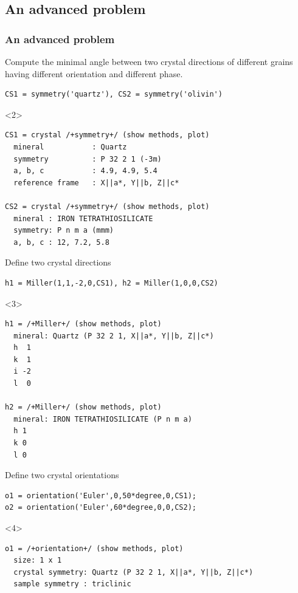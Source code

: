 \documentclass[compress]{beamer}
\begin{document}
\subsection*{An advanced problem}

\begin{frame}[fragile]
  \frametitle{An advanced problem}

  \begin{overlayarea}{\textwidth}{8cm}

  Compute the minimal angle between two crystal directions of
  different grains having different orientation and different phase.

  \pause

  \begin{lstlisting}[style=input]
CS1 = symmetry('quartz'), CS2 = symmetry('olivin')
\end{lstlisting}

  \begin{onlyenv}<2>
\vspace{-.3cm}\begin{lstlisting}[style=output]
CS1 = crystal /+symmetry+/ (show methods, plot)
  mineral           : Quartz
  symmetry          : P 32 2 1 (-3m)
  a, b, c           : 4.9, 4.9, 5.4
  reference frame   : X||a*, Y||b, Z||c*

CS2 = crystal /+symmetry+/ (show methods, plot)
  mineral : IRON TETRATHIOSILICATE
  symmetry: P n m a (mmm)
  a, b, c : 12, 7.2, 5.8
\end{lstlisting}
  \end{onlyenv}

 \pause

 Define two crystal directions
 \begin{lstlisting}[style=input]
h1 = Miller(1,1,-2,0,CS1), h2 = Miller(1,0,0,CS2)
 \end{lstlisting}
  \begin{onlyenv}<3>
\vspace{-.3cm}\begin{lstlisting}[style=output]
h1 = /+Miller+/ (show methods, plot)
  mineral: Quartz (P 32 2 1, X||a*, Y||b, Z||c*)
  h  1
  k  1
  i -2
  l  0

h2 = /+Miller+/ (show methods, plot)
  mineral: IRON TETRATHIOSILICATE (P n m a)
  h 1
  k 0
  l 0
\end{lstlisting}
  \end{onlyenv}

  \pause

 Define two crystal orientations
 \begin{lstlisting}[style=input]
o1 = orientation('Euler',0,50*degree,0,CS1);
o2 = orientation('Euler',60*degree,0,0,CS2);
 \end{lstlisting}
  \begin{onlyenv}<4>
\vspace{-.3cm}\begin{lstlisting}[style=output]
o1 = /+orientation+/ (show methods, plot)
  size: 1 x 1
  crystal symmetry: Quartz (P 32 2 1, X||a*, Y||b, Z||c*)
  sample symmetry : triclinic


\end{lstlisting}
\end{onlyenv}
\end{overlayarea}
\end{frame}
\end{document}

